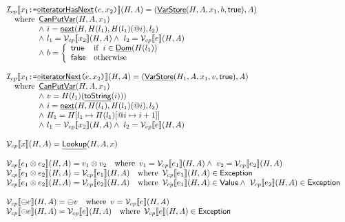 \documentclass{article}
\makeatletter
\newcommand{\SF}[1]{\mbox{\textsf{#1}}}
\newcommand{\TT}[1]{\mbox{\texttt{#1}}}
\newcommand{\inop}{\ensuremath{\otimes}}
\newcommand{\preop}{\ensuremath{\ominus}}
\newcommand{\wherec}[1]{{\rm where}\begin{array}[t]{l}#1\end{array}}
\newcommand{\ifc}[1]{{\rm if}\begin{array}[t]{l}#1\end{array}}
\newcommand{\owc}{{\rm otherwise}}
\newcommand{\Value}{\SF{Value}}
\newcommand{\I}{\mathcal{I}}
\newcommand{\V}{\mathcal{V}}
\newcommand{\lbr}{\llbracket}
\newcommand{\rbr}{\rrbracket}
\newcommand{\hfi}[1]{\hf{\ensuremath{\diamond}#1}}
\newcommand{\hf}[1]{\underline{\sf #1}}
\newcommand{\varprop}[1]{@#1}
\newcommand{\vtrue}{\SF{true}}
\newcommand{\vfalse}{\SF{false}}
\makeatother
\begin{document}
\[\begin{array}{ll}
\I _{cp}\lbr x_1 \TT{:=} \hfi{iteratorHasNext}\TT{(}e,x_2\TT{)} \rbr(H,A)
 = (\hf{VarStore}(H,A,x_1,b,\vtrue),A) \\
\quad\wherec{\hf{CanPutVar}(H,A,x_1) \\
  \land\ i=\hf{next}(H,H(l_1),H(l_1)(\varprop{i}),l_2) \\
  \land\ l_1 = \V_{cp}\lbr x_2\rbr (H,A)
  \land\ l_2 = \V_{cp}\lbr e\rbr (H,A)\\
  \land\ b=\left\{
    \begin{array}{ll}
      \vtrue & \ifc{i\in \hf{Dom}(H(l_1))} \\
      \vfalse & \owc
    \end{array}
  \right.
}
\\\\
\I _{cp}\lbr x_1 \TT{:=} \hfi{iteratorNext}\TT{(}e,x_2\TT{)} \rbr(H,A)
 = (\hf{VarStore}(H_1,A,x_1,v,\vtrue),A) \\
\quad\wherec{\hf{CanPutVar}(H,A,x_1) \\
  \land\ v=H(l_1)(\hf{toString}(i))) \\
  \land\ i=\hf{next}(H,H(l_1),H(l_1)(\varprop{i}),l_2) \\
  \land\ H_1 = H[l_1\mapsto H(l_1)[\varprop{i}\mapsto i+1]] \\
  \land\ l_1 = \V_{cp}\lbr x_2\rbr (H,A)
  \land\ l_2 = \V_{cp}\lbr e\rbr (H,A)
}
\\\\

\V_{cp}\lbr x \rbr(H,A) = \hf{Lookup}(H,A,x)\\
\\

\V _{cp}\lbr e_1\inop e_2 \rbr(H,A)
   = v_1\inop v_2 
\quad\wherec{
  v_1 = \V _{cp}\lbr e_1\rbr(H,A)\land\ v_2 = \V _{cp}\lbr e_2\rbr(H,A)
}
\\
\V _{cp}\lbr e_1\inop e_2 \rbr(H,A)
   = \V_{cp}\lbr e_1\rbr(H,A)
\quad\wherec{
  \V_{cp}\lbr e_1\rbr(H,A) \in \SF{Exception}
}
\\
\V _{cp}\lbr e_1\inop e_2 \rbr(H,A)
   = \V_{cp}\lbr e_2\rbr(H,A)
\quad\wherec{
  \V_{cp}\lbr e_1\rbr(H,A) \in \Value
  \land\ \V_{cp}\lbr e_2\rbr(H,A) \in \SF{Exception}
}
\\\\

\V _{cp}\lbr\preop e \rbr(H,A)
   = \preop v
\quad\wherec{
  v = \V _{cp}\lbr e\rbr(H,A)
}
\\
\V _{cp}\lbr\preop e \rbr(H,A)
   = \V _{cp}\lbr e\rbr(H,A)
\quad\wherec{
  \V _{cp}\lbr e\rbr(H,A) \in \SF{Exception}
}
\\\\


\end{array}\]
\end{document}
